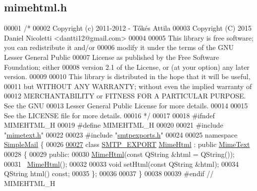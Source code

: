 \hypertarget{mimehtml_8h_source}{}\subsection{mimehtml.\+h}
\label{mimehtml_8h_source}

\begin{DoxyCode}
00001 \textcolor{comment}{/*}
00002 \textcolor{comment}{  Copyright (c) 2011-2012 - Tőkés Attila}
00003 \textcolor{comment}{  Copyright (C) 2015 Daniel Nicoletti <dantti12@gmail.com>}
00004 \textcolor{comment}{}
00005 \textcolor{comment}{  This library is free software; you can redistribute it and/or}
00006 \textcolor{comment}{  modify it under the terms of the GNU Lesser General Public}
00007 \textcolor{comment}{  License as published by the Free Software Foundation; either}
00008 \textcolor{comment}{  version 2.1 of the License, or (at your option) any later version.}
00009 \textcolor{comment}{}
00010 \textcolor{comment}{  This library is distributed in the hope that it will be useful,}
00011 \textcolor{comment}{  but WITHOUT ANY WARRANTY; without even the implied warranty of}
00012 \textcolor{comment}{  MERCHANTABILITY or FITNESS FOR A PARTICULAR PURPOSE.  See the GNU}
00013 \textcolor{comment}{  Lesser General Public License for more details.}
00014 \textcolor{comment}{}
00015 \textcolor{comment}{  See the LICENSE file for more details.}
00016 \textcolor{comment}{*/}
00017 
00018 \textcolor{preprocessor}{#ifndef MIMEHTML\_H}
00019 \textcolor{preprocessor}{#define MIMEHTML\_H}
00020 
00021 \textcolor{preprocessor}{#include "\hyperlink{mimetext_8h}{mimetext.h}"}
00022 
00023 \textcolor{preprocessor}{#include "\hyperlink{smtpexports_8h}{smtpexports.h}"}
00024 
00025 \textcolor{keyword}{namespace }\hyperlink{namespace_simple_mail}{SimpleMail} \{
00026 
\hyperlink{class_simple_mail_1_1_mime_html}{00027} \textcolor{keyword}{class }\hyperlink{smtpexports_8h_ac580c9660cb24a34b13807f4eb0e1bd0}{SMTP\_EXPORT} \hyperlink{class_simple_mail_1_1_mime_html}{MimeHtml} : \textcolor{keyword}{public} \hyperlink{class_simple_mail_1_1_mime_text}{MimeText}
00028 \{
00029 \textcolor{keyword}{public}:
00030     \hyperlink{class_simple_mail_1_1_mime_html}{MimeHtml}(\textcolor{keyword}{const} QString &html = QString());
00031     ~\hyperlink{class_simple_mail_1_1_mime_html}{MimeHtml}();
00032 
00033     \textcolor{keywordtype}{void} setHtml(\textcolor{keyword}{const} QString &html);
00034     QString html() \textcolor{keyword}{const};
00035 \};
00036 
00037 \}
00038 
00039 \textcolor{preprocessor}{#endif // MIMEHTML\_H}
\end{DoxyCode}
